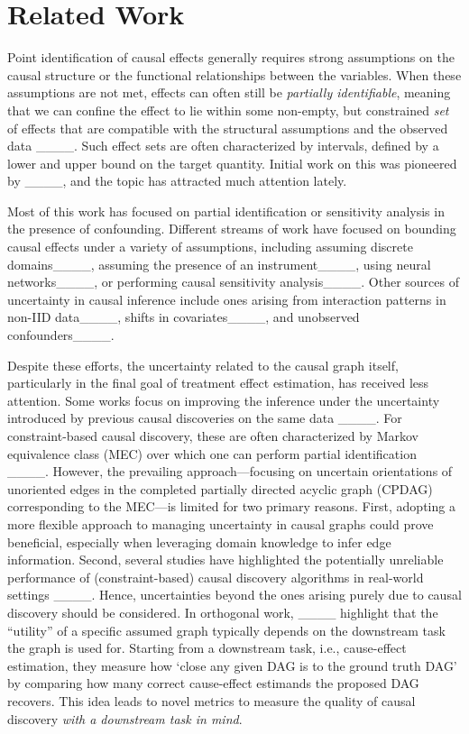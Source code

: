 \section{Related Work}
\label{sec:rel-work}

Point identification of causal effects generally requires strong assumptions on the causal structure or the functional relationships between the variables. When these assumptions are not met, effects can often still be \emph{partially identifiable}, meaning that we can confine the effect to lie within some non-empty, but constrained \emph{set} of effects that are compatible with the structural assumptions and the observed data ____. Such effect sets are often characterized by intervals, defined by a lower and upper bound on the target quantity. Initial work on this was pioneered by ____, and the topic has attracted much attention lately. 

Most of this work has focused on partial identification or sensitivity analysis in the presence of confounding. Different streams of work have focused on bounding causal effects under a variety of assumptions, including assuming discrete domains____, assuming the presence of an instrument____, using neural networks____, or performing causal sensitivity analysis____.
Other sources of uncertainty in causal inference include ones arising from interaction patterns in non-IID data____, shifts in covariates____, and unobserved confounders____.

Despite these efforts, the uncertainty related to the causal graph itself, particularly in the final goal of treatment effect estimation, has received less attention.
Some works focus on improving the inference under the uncertainty introduced by previous causal discoveries on the same data ____.
For constraint-based causal discovery, these are often characterized by Markov equivalence class (MEC) over which one can perform partial identification ____.
However, the prevailing approach---focusing on uncertain orientations of unoriented edges in the completed partially directed acyclic graph (CPDAG) corresponding to the MEC---is limited for two primary reasons.
First, adopting a more flexible approach to managing uncertainty in causal graphs could prove beneficial, especially when leveraging domain knowledge to infer edge information.
Second, several studies have highlighted the potentially unreliable performance of (constraint-based) causal discovery algorithms in real-world settings ____. Hence, uncertainties beyond the ones arising purely due to causal discovery should be considered.
In orthogonal work, ____ highlight that the ``utility'' of a specific assumed graph typically depends on the downstream task the graph is used for. Starting from a downstream task, i.e., cause-effect estimation, they measure how `close any given DAG is to the ground truth DAG' by comparing how many correct cause-effect estimands the proposed DAG recovers. This idea leads to novel metrics to measure the quality of causal discovery \emph{with a downstream task in mind}.

